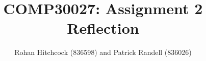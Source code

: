 \documentclass[11pt]{article}
\begin{document}
\title{\textbf{COMP30027: Assignment 2 Reflection}}
\author{Rohan Hitchcock (836598) and Patrick Randell (836026)}
\date{}
\maketitle
\end{document}
